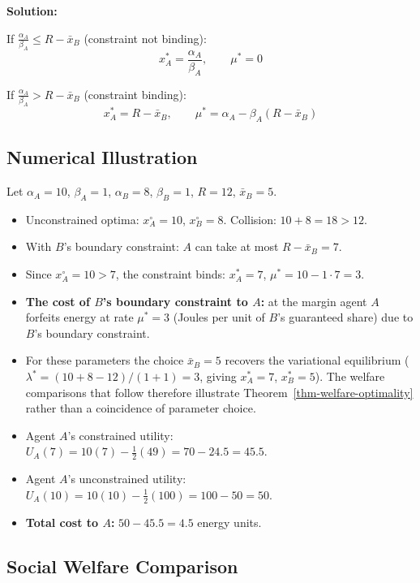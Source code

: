 \documentclass[11pt]{article}
\theoremstyle{plain}
\theoremstyle{definition}
\theoremstyle{remark}
\let\origsubsection\subsection
\renewcommand{\subsection}{\needspace{7\baselineskip}\origsubsection}
\providecommand{\tightlist}{%
  \setlength{\itemsep}{0pt}\setlength{\parskip}{0pt}}
\begin{document}
\textbf{Solution:}

If \(\frac{\alpha_A}{\beta_A} \leq R - \bar{x}_B\) (constraint not
binding): \[x_A^* = \frac{\alpha_A}{\beta_A}, \qquad \mu^* = 0\]

If \(\frac{\alpha_A}{\beta_A} > R - \bar{x}_B\) (constraint binding):
\[x_A^* = R - \bar{x}_B, \qquad \mu^* = \alpha_A - \beta_A(R - \bar{x}_B)\]

\subsection{Numerical Illustration}\label{numerical-illustration}

Let \(\alpha_A = 10\), \(\beta_A = 1\), \(\alpha_B = 8\),
\(\beta_B = 1\), \(R = 12\), \(\bar{x}_B = 5\).

\begin{itemize}
\tightlist
\item
  Unconstrained optima: \(x_A^{\circ} = 10\), \(x_B^{\circ} = 8\).
  Collision: \(10 + 8 = 18 > 12\).
\item
  With \(B\)'s boundary constraint: \(A\) can take at most
  \(R - \bar{x}_B = 7\).
\item
  Since \(x_A^{\circ} = 10 > 7\), the constraint binds: \(x_A^* = 7\),
  \(\mu^* = 10 - 1 \cdot 7 = 3\).
\item
  \textbf{The cost of \(B\)'s boundary constraint to \(A\):} at the
  margin agent \(A\) forfeits energy at rate \(\mu^* = 3\) (Joules per
  unit of \(B\)'s guaranteed share) due to \(B\)'s boundary constraint.
\item
  For these parameters the choice \(\bar{x}_B = 5\) recovers the
  variational equilibrium (\(\lambda^* = (10+8-12)/(1+1) = 3\), giving
  \(x_A^* = 7\), \(x_B^* = 5\)). The welfare comparisons that follow
  therefore illustrate Theorem~\ref{thm-welfare-optimality} rather than
  a coincidence of parameter choice.
\item
  Agent \(A\)'s constrained utility:
  \(U_A(7) = 10(7) - \frac{1}{2}(49) = 70 - 24.5 = 45.5\).
\item
  Agent \(A\)'s unconstrained utility:
  \(U_A(10) = 10(10) - \frac{1}{2}(100) = 100 - 50 = 50\).
\item
  \textbf{Total cost to \(A\):} \(50 - 45.5 = 4.5\) energy units.
\end{itemize}

\subsection{Social Welfare Comparison}\label{social-welfare-comparison}
\end{document}
